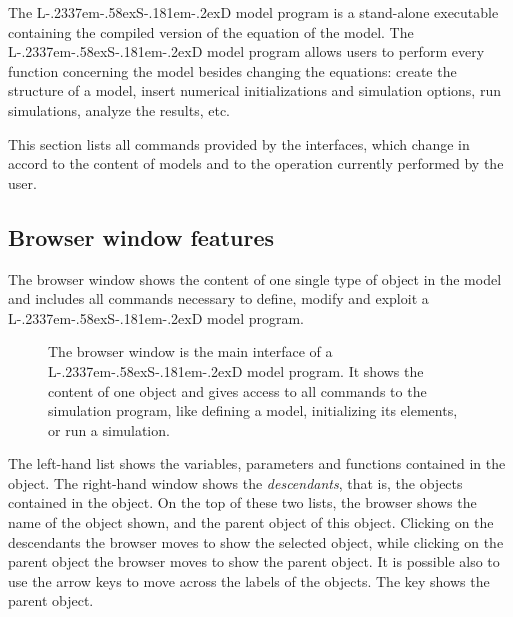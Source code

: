 \documentclass [11pt,a4paper] {book}
\def\LsD{{L\kern-.2337em\lower-.58ex\hbox{S}\kern-.181em\lower-.2ex\hbox{D}}\xspace}
\begin{document}
The \LsD model program is a stand-alone executable containing the compiled version of the equation of the model. The \LsD model program allows users to perform every function concerning the model besides changing the equations: create the structure of a model, insert numerical initializations and simulation options, run simulations, analyze the results, etc. 

This section lists all commands provided by the interfaces, which change in accord to the content of models and to the operation currently performed by the user.

\subsection{Browser window features}
The browser window shows the content of one single type of object in the model and includes all commands necessary to define, modify and exploit a \LsD model program. 

\begin{figure}[ht]
  \centering
  \caption{\small The browser window is the main interface of a \LsD model program. It shows the content of one object and gives access to all commands to the simulation program, like defining a model, initializing its elements, or run a simulation.}
   \label{fig:browser1}
\end{figure}

The left-hand list shows the variables, parameters and functions contained in the object. The right-hand window shows the \textit{descendants}, that is, the objects contained in the object. On the top of these two lists, the browser shows the name of the object shown, and the parent object of this object. Clicking on the descendants the browser moves to show the selected object, while clicking on the parent object the browser moves to show the parent object. It is possible also to use the arrow keys to move across the labels of the objects. The key  shows the parent object.
\end{document}
